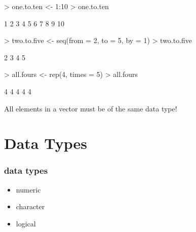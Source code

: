 \documentclass[handout]{beamer}
\newcommand{\red}{\color{red}}
\begin{document}
\begin{frame}[fragile]
\red
\begin{Schunk}
\begin{Sinput}
> one.to.ten <- 1:10
> one.to.ten
\end{Sinput}
\begin{Soutput}
 [1]  1  2  3  4  5  6  7  8  9 10
\end{Soutput}
\end{Schunk}
\pause
\bigskip
\begin{Schunk}
\begin{Sinput}
> two.to.five <- seq(from = 2, to = 5, by = 1)
> two.to.five
\end{Sinput}
\begin{Soutput}
[1] 2 3 4 5
\end{Soutput}
\end{Schunk}
\pause
\bigskip
\begin{Schunk}
\begin{Sinput}
> all.fours <- rep(4, times = 5)
> all.fours
\end{Sinput}
\begin{Soutput}
[1] 4 4 4 4 4
\end{Soutput}
\end{Schunk}
\end{frame}

\begin{frame}
\begin{center}
All elements in a vector must be of the same data type!
\end{center}
\end{frame}

\section{Data Types}
\begin{frame}
\frametitle{data types}
\begin{itemize}
\item numeric
\item character
\item logical
\end{itemize}
\end{frame}
\end{document}
